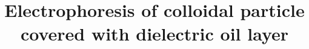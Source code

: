 \documentclass[11 pt]{article}
\date{}
\begin{document}
\newcommand{\be}{\begin{equation}}
\newcommand{\ee}{\end{equation}}
\newcommand{\bea}{\begin{eqnarray}}
\newcommand{\eea}{\end{eqnarray}}
\newcommand{\nn}{\nonumber}
\newcommand{\ba}{\begin{array}}
\newcommand{\ea}{\end{array}}
\newcommand{\lb}{\label}
\newcommand{\ben}{\begin{enumerate}}
\newcommand{\een}{\end{enumerate}}
\newcommand{\alpheqn}{\setcounter{saveeqn}{\value{equation}}%
\stepcounter{saveeqn}\setcounter{equation}{0}%
\renewcommand{\theequation}{\mbox{\arabic{saveeqn}\alph{equation}}}}
\newcommand{\reseteqn}{\setcounter{equation}{\value{saveeqn}}%
\renewcommand{\theequation}{\arabic{equation}}}
\thispagestyle{empty}


\title{\textbf{Electrophoresis of colloidal particle covered with dielectric oil layer}}
%
 \maketitle
\end{document}
